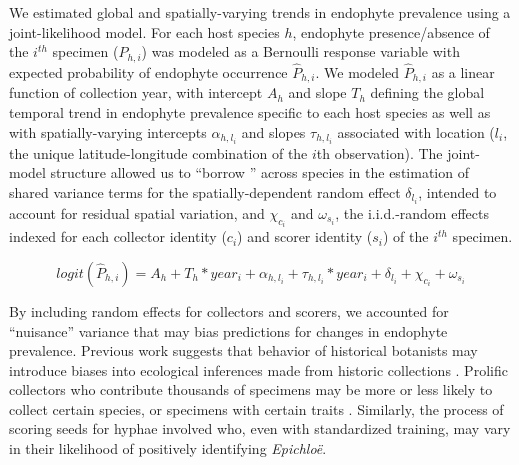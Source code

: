 \documentclass[11pt]{article}
\let\cite\citep
\newcommand{\firstrevise}[1]{{\color{black}{#1}}}
\begin{document}
We estimated global and spatially-varying trends in endophyte prevalence using a joint-likelihood model. 
For each host species $h$, endophyte presence/absence of the $i^{th}$ specimen ($P_{h,i}$) was modeled as a Bernoulli response variable with expected probability of endophyte occurrence $\hat{P}_{h,i}$.
We modeled $\hat{P}_{h,i}$ as a linear function of collection year, with intercept $A_{h}$ and slope $T_{h}$ defining the global temporal trend in endophyte prevalence specific to each host species as well as with spatially-varying intercepts $\alpha_{h,l_{i}} $ and slopes $\tau_{h,l_i}$ associated with location ($l_i$, the unique latitude-longitude combination of the $i$th observation).
The joint-model structure allowed us to ``borrow \firstrevise{information}''  across species in the estimation of shared variance terms for the spatially-dependent random effect $\delta_{l_i}$, intended to account for residual spatial variation, and $\chi_{c_i}$ and $\omega_{s_i}$, the i.i.d.-random effects indexed for each collector identity ($c_i$) and scorer identity ($s_i$) of the $i^{th}$ specimen.

\begin{equation}
	\label{eq:trends}
		logit(\hat{P}_{h,i}) = A_{h} + T_{h}*year_i  + \alpha_{h,l_{i}} + \tau_{h,l_i}*year_i + \delta_{l_i} + \chi_{c_i} + \omega_{s_i} 
\end{equation}

By including random effects for collectors and scorers, we accounted for ``nuisance'' variance that may bias predictions for changes in endophyte prevalence.
Previous work suggests that behavior of historical botanists may introduce biases into ecological inferences made from historic collections \cite{kozlov2020biases}. 
Prolific collectors who contribute thousands of specimens may be more or less likely to collect certain species, or specimens with certain traits \cite{daru2018widespread}. 
Similarly, the process of scoring seeds for hyphae involved \linelabel{R2C35-begin}\firstrevise{multiple researchers (or "scorers")} who, even with standardized training, may vary in their likelihood of positively identifying \emph{Epichloë}. 
\end{document}
